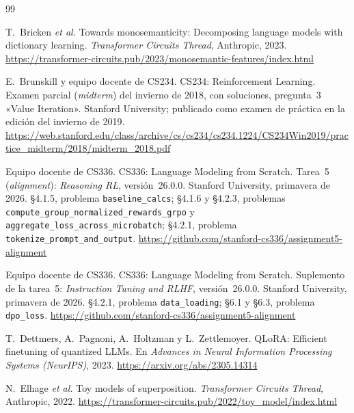 \begin{thebibliography}{99}
\small

T.~Bricken \emph{et al.}
\newblock Towards monosemanticity: Decomposing language models with dictionary learning.
\newblock \emph{Transformer Circuits Thread}, Anthropic, 2023.
\newblock \url{https://transformer-circuits.pub/2023/monosemantic-features/index.html}

E.~Brunskill y equipo docente de CS234.
\newblock CS234: Reinforcement Learning. Examen parcial (\emph{midterm}) del invierno de 2018, con soluciones, pregunta~3 «Value Iteration».
\newblock Stanford University; publicado como examen de práctica en la edición del invierno de 2019.
\newblock \url{https://web.stanford.edu/class/archive/cs/cs234/cs234.1224/CS234Win2019/practice_midterm/2018/midterm_2018.pdf}

Equipo docente de CS336.
\newblock CS336: Language Modeling from Scratch. Tarea~5 (\emph{alignment}): \emph{Reasoning RL}, versión~26.0.0.
\newblock Stanford University, primavera de 2026. §4.1.5, problema \texttt{baseline\_\allowbreak calcs}; §4.1.6 y §4.2.3, problemas \texttt{compute\_\allowbreak group\_\allowbreak normalized\_\allowbreak rewards\_\allowbreak grpo} y \texttt{aggregate\_\allowbreak loss\_\allowbreak across\_\allowbreak microbatch}; §4.2.1, problema \texttt{tokenize\_\allowbreak prompt\_\allowbreak and\_\allowbreak output}.
\newblock \url{https://github.com/stanford-cs336/assignment5-alignment}

Equipo docente de CS336.
\newblock CS336: Language Modeling from Scratch. Suplemento de la tarea~5: \emph{Instruction Tuning and RLHF}, versión~26.0.0.
\newblock Stanford University, primavera de 2026. §4.2.1, problema \texttt{data\_\allowbreak loading}; §6.1 y §6.3, problema \texttt{dpo\_\allowbreak loss}.
\newblock \url{https://github.com/stanford-cs336/assignment5-alignment}

T.~Dettmers, A.~Pagnoni, A.~Holtzman y L.~Zettlemoyer.
\newblock QLoRA: Efficient finetuning of quantized LLMs.
\newblock En \emph{Advances in Neural Information Processing Systems (NeurIPS)}, 2023.
\newblock \url{https://arxiv.org/abs/2305.14314}

N.~Elhage \emph{et al.}
\newblock Toy models of superposition.
\newblock \emph{Transformer Circuits Thread}, Anthropic, 2022.
\newblock \url{https://transformer-circuits.pub/2022/toy_model/index.html}


\end{thebibliography}
